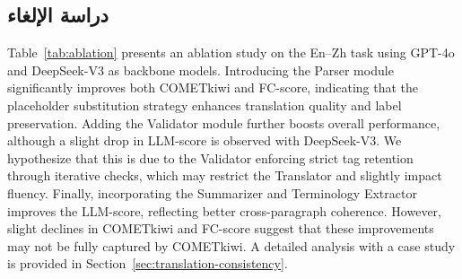 \documentclass[11pt]{article}
\begin{document}
\subsection{دراسة الإلغاء}
Table~\ref{tab:ablation} presents an ablation study on the En–Zh task using GPT-4o and DeepSeek-V3 as backbone models. Introducing the Parser module significantly improves both COMETkiwi and FC-score, indicating that the placeholder substitution strategy enhances translation quality and label preservation. Adding the Validator module further boosts overall performance, although a slight drop in LLM-score is observed with DeepSeek-V3. We hypothesize that this is due to the Validator enforcing strict tag retention through iterative checks, which may restrict the Translator and slightly impact fluency. Finally, incorporating the Summarizer and Terminology Extractor improves the LLM-score, reflecting better cross-paragraph coherence. However, slight declines in COMETkiwi and FC-score suggest that these improvements may not be fully captured by COMETkiwi. A detailed analysis with a case study is provided in Section~\ref{sec:translation-consistency}.

\begin{table}[t]
  \setlength{\tabcolsep}{1.5pt}
  \small
  \centering
  \caption{
  أداء LaTeXTrans مع إعدادات مختلفة.
  ``SA.'' تشير إلى قاعدة الترجمة المعتمدة على LLM، ``P.'' تعني المحلل، ``V.'' تعني المدقق، ``S.'' تعني الملخص، و``TE.'' تعني مستخرج المصطلحات.  ``SA. + P. + V. + S. + TE.'' تتوافق مع LaTeXTrans لدينا.
}
  \vspace{-0.4cm}
  \label{tab:ablation}
\end{table}
\end{document}
